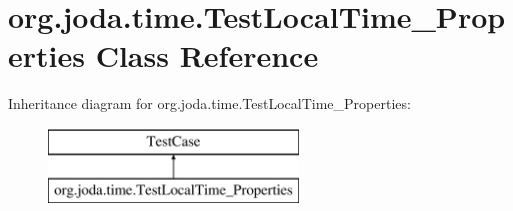 \hypertarget{classorg_1_1joda_1_1time_1_1_test_local_time___properties}{\section{org.\-joda.\-time.\-Test\-Local\-Time\-\_\-\-Properties Class Reference}
\label{classorg_1_1joda_1_1time_1_1_test_local_time___properties}
}
Inheritance diagram for org.\-joda.\-time.\-Test\-Local\-Time\-\_\-\-Properties\-:\begin{figure}[H]
\begin{center}
\leavevmode
\includegraphics[height=2.000000cm]{classorg_1_1joda_1_1time_1_1_test_local_time___properties}
\end{center}
\end{figure}
